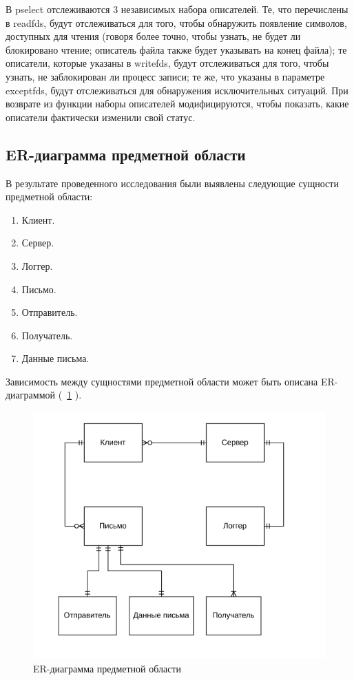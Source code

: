 \documentclass[a4paper,12pt]{report}
\begin{document}
В pselect отслеживаются 3 независимых набора описателей. Те, что перечислены в readfds, будут отслеживаться для того, чтобы обнаружить появление символов, доступных для чтения (говоря более точно, чтобы узнать, не будет ли блокировано чтение; описатель файла также будет указывать на конец файла); те описатели, которые указаны в writefds, будут отслеживаться для того, чтобы узнать, не заблокирован ли процесс записи; те же, что указаны в параметре exceptfds, будут отслеживаться для обнаружения исключительных ситуаций. При возврате из функции наборы описателей модифицируются, чтобы показать, какие описатели фактически изменили свой статус.


\subsection{ER-диаграмма предметной области}

В результате проведенного исследования были выявлены следующие сущности предметной области:

\begin{enumerate}
	\item Клиент.
	\item Сервер.
	\item Логгер.
	\item Письмо.
    \item Отправитель.
    \item Получатель.
    \item Данные письма.
\end{enumerate}

Зависимость между сущностями предметной области может быть описана ER-диаграммой (~\ref{fig:er_diagram} ).
\begin{figure}
    \centering
    \includegraphics[width=\textwidth]{../images/er.png}
    \caption{ER-диаграмма предметной области}
    \label{fig:er_diagram}
\end{figure}
\end{document}

